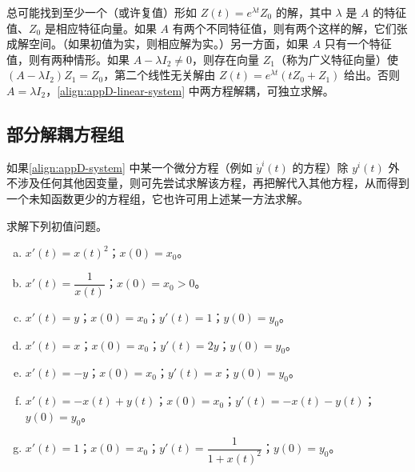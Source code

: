 \documentclass[../../main.tex]{subfiles}
\begin{document}
总可能找到至少一个（或许复值）形如 $Z(t)=e^{\lambda t}Z_0$ 的解，其中 $\lambda$ 是 $A$ 的特征值、$Z_0$ 是相应特征向量。如果 $A$ 有两个不同特征值，则有两个这样的解，它们张成解空间。（如果初值为实，则相应解为实。）另一方面，如果 $A$ 只有一个特征值，则有两种情形。如果 $A-\lambda I_2\neq0$，则存在向量 $Z_1$（称为广义特征向量）使 $(A-\lambda I_2)Z_1=Z_0$，第二个线性无关解由 $Z(t)=e^{\lambda t}(tZ_0+Z_1)$ 给出。否则 $A=\lambda I_2$，\eqref{align:appD-linear-system} 中两方程解耦，可独立求解。

\subsection*{部分解耦方程组}

如果\eqref{align:appD-system} 中某一个微分方程（例如 $\dot y^i(t)$ 的方程）除 $y^i(t)$ 外不涉及任何其他因变量，则可先尝试求解该方程，再把解代入其他方程，从而得到一个未知函数更少的方程组，它也许可用上述某一方法求解。

\begin{exercise}\label{exercise:appD-D-7}
求解下列初值问题。
\begin{enumerate}[(a)]
\item $x'(t)=x(t)^2$；$x(0)=x_0$。
\item $x'(t)=\dfrac{1}{x(t)}$；$x(0)=x_0>0$。
\item $x'(t)=y$；$x(0)=x_0$；$y'(t)=1$；$y(0)=y_0$。
\item $x'(t)=x$；$x(0)=x_0$；$y'(t)=2y$；$y(0)=y_0$。
\item $x'(t)=-y$；$x(0)=x_0$；$y'(t)=x$；$y(0)=y_0$。
\item $x'(t)=-x(t)+y(t)$；$x(0)=x_0$；$y'(t)=-x(t)-y(t)$；$y(0)=y_0$。
\item $x'(t)=1$；$x(0)=x_0$；$y'(t)=\dfrac{1}{1+x(t)^2}$；$y(0)=y_0$。
\end{enumerate}
\end{exercise}
\end{document}
